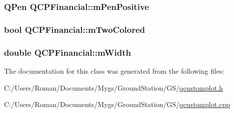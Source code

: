 \subsubsection[{m\+Pen\+Positive}]{\setlength{\rightskip}{0pt plus 5cm}Q\+Pen Q\+C\+P\+Financial\+::m\+Pen\+Positive\hspace{0.3cm}{\ttfamily [protected]}}\label{class_q_c_p_financial_aa6599186f417ba615caebb3f6c762bd8}
\hypertarget{class_q_c_p_financial_a6afe919190b884d9bac026cefcc8c0a8}{}
\subsubsection[{m\+Two\+Colored}]{\setlength{\rightskip}{0pt plus 5cm}bool Q\+C\+P\+Financial\+::m\+Two\+Colored\hspace{0.3cm}{\ttfamily [protected]}}\label{class_q_c_p_financial_a6afe919190b884d9bac026cefcc8c0a8}
\hypertarget{class_q_c_p_financial_af630e5eb8485146b9c777e63fd1cf993}{}
\subsubsection[{m\+Width}]{\setlength{\rightskip}{0pt plus 5cm}double Q\+C\+P\+Financial\+::m\+Width\hspace{0.3cm}{\ttfamily [protected]}}\label{class_q_c_p_financial_af630e5eb8485146b9c777e63fd1cf993}


The documentation for this class was generated from the following files\+:\begin{DoxyCompactItemize}
\item 
C\+:/\+Users/\+Roman/\+Documents/\+Mygs/\+Ground\+Station/\+G\+S/\hyperlink{qcustomplot_8h}{qcustomplot.\+h}\item 
C\+:/\+Users/\+Roman/\+Documents/\+Mygs/\+Ground\+Station/\+G\+S/\hyperlink{qcustomplot_8cpp}{qcustomplot.\+cpp}\end{DoxyCompactItemize}
